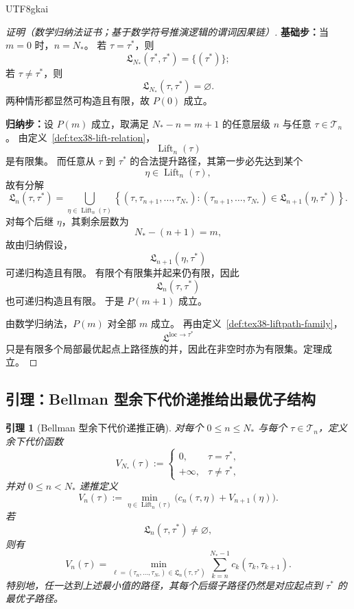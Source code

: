 \documentclass[12pt]{article}
\newtheorem{lemma}{引理}[section]
\newcommand{\Lift}{\operatorname{Lift}}
\begin{document}
\begin{CJK*}{UTF8}{gkai}
\begin{proof}[证明（数学归纳法证书；基于数学符号推演逻辑的谓词因果链）]
\textbf{基础步：}当 $m=0$ 时，$n=N_\ast$。
若 $\tau=\tau^\ast$，则
\[
  \mathfrak L_{N_\ast}(\tau^\ast,\tau^\ast)=\{(\tau^\ast)\};
\]
若 $\tau\neq\tau^\ast$，则
\[
  \mathfrak L_{N_\ast}(\tau,\tau^\ast)=\varnothing.
\]
两种情形都显然可构造且有限，故 $P(0)$ 成立。

\textbf{归纳步：}设 $P(m)$ 成立，取满足 $N_\ast-n=m+1$ 的任意层级 $n$ 与任意 $\tau\in\mathcal T_n$。
由定义~\ref{def:tex38-lift-relation}，
\[
  \Lift_n(\tau)
\]
是有限集。
而任意从 $\tau$ 到 $\tau^\ast$ 的合法提升路径，其第一步必先达到某个
\[
  \eta\in\Lift_n(\tau),
\]
故有分解
\[
  \mathfrak L_n(\tau,\tau^\ast)
  =
  \bigcup_{\eta\in\Lift_n(\tau)}
  \left\{
    (\tau,\tau_{n+1},\dots,\tau_{N_\ast}):
    (\tau_{n+1},\dots,\tau_{N_\ast})\in\mathfrak L_{n+1}(\eta,\tau^\ast)
  \right\}.
\]
对每个后继 $\eta$，其剩余层数为
\[
  N_\ast-(n+1)=m,
\]
故由归纳假设，
\[
  \mathfrak L_{n+1}(\eta,\tau^\ast)
\]
可递归构造且有限。
有限个有限集并起来仍有限，因此
\[
  \mathfrak L_n(\tau,\tau^\ast)
\]
也可递归构造且有限。
于是 $P(m+1)$ 成立。

由数学归纳法，$P(m)$ 对全部 $m$ 成立。
再由定义~\ref{def:tex38-liftpath-family}，
\[
  \mathfrak L^{\mathrm{loc}\to\tau^\ast}
\]
只是有限多个局部最优起点上路径族的并，因此在非空时亦为有限集。定理成立。
\end{proof}

\subsection{引理：Bellman 型余下代价递推给出最优子结构}
\label{subsec:tex38-bellman}

\begin{lemma}[Bellman 型余下代价递推正确]
\label{lem:tex38-bellman}
对每个 $0\le n\le N_\ast$ 与每个 $\tau\in\mathcal T_n$，定义余下代价函数
\[
  V_{N_\ast}(\tau)
  :=
  \begin{cases}
    0,&\tau=\tau^\ast,\\
    +\infty,&\tau\neq\tau^\ast,
  \end{cases}
\]
并对 $0\le n<N_\ast$ 递推定义
\[
  V_n(\tau)
  :=
  \min_{\eta\in\Lift_n(\tau)}
  \bigl(
    c_n(\tau,\eta)+V_{n+1}(\eta)
  \bigr).
\]
若
\[
  \mathfrak L_n(\tau,\tau^\ast)\neq\varnothing,
\]
则有
\[
  V_n(\tau)
  =
  \min_{\ell=(\tau_n,\dots,\tau_{N_\ast})\in\mathfrak L_n(\tau,\tau^\ast)}
  \sum_{k=n}^{N_\ast-1}c_k(\tau_k,\tau_{k+1}).
\]
特别地，任一达到上述最小值的路径，其每个后缀子路径仍然是对应起点到 $\tau^\ast$ 的最优子路径。
\end{lemma}


\end{CJK*}
\end{document}
